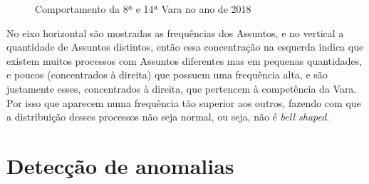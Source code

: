 \begin{figure}[h]
	\centering
	\qquad
	\caption{Comportamento da 8ª e 14ª Vara no ano de 2018}%
\end{figure}
\pagebreak
No eixo horizontal são mostradas as frequências dos Assuntos, e no vertical a quantidade de Assuntos distintos, então essa concentração na esquerda indica que existem muitos processos com Assuntos diferentes mas em pequenas quantidades, e poucos (concentrados à direita) que possuem uma frequência alta, e são justamente esses, concentrados à direita, que pertencem à competência da Vara. Por isso que aparecem numa frequência tão superior aos outros, fazendo com que a distribuição desses processos não seja normal, ou seja, não é \textit{bell shaped}.

\section{Detecção de anomalias}

